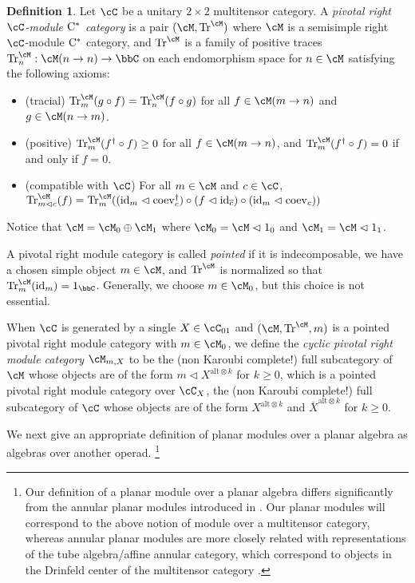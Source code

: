 \documentclass[11pt]{article}
\theoremstyle{plain}
\theoremstyle{definition}
\newtheorem{defn}[thm]{Definition}
\DeclareMathOperator{\coev}{coev}
\DeclareMathOperator{\id}{id}
\DeclareMathOperator{\Tr}{Tr}
\newcommand{\Cstar}{\rm{C^*}}
\begin{document}
\begin{defn}
 \label{def:PivotalModule}
Let $\cC$ be a unitary $2\times 2$ multitensor category.
A \emph{pivotal right $\cC$-module $\Cstar$ category} is a pair $(\cM,\Tr^\cM)$ where
$\cM$ is a semisimple right $\cC$-module $\Cstar$ category, and $\Tr^\cM$ is a family of positive traces $\Tr^\cM_n:\cM(n \to n)\to \bbC$ on each endomorphism space for $n\in \cM$ satisfying the following axioms:
\begin{itemize}
\item
(tracial)
$\Tr^\cM_m(g \circ f) = \Tr^\cM_n(f\circ g)$ for all $f\in \cM(m\to n)$ and $g\in \cM(n \to m)$.
\item
(positive)
$\Tr^\cM_m(f^\dag \circ f) \geq 0$ for all $f\in \cM(m \to n)$, and $\Tr^\cM_m(f^\dag \circ f) =0$ if and only if $f = 0$.
\item
(compatible with $\cC$)
For all $m\in \cM$ and $c\in \cC$,
$
\Tr^\cM_{m\vartriangleleft c}(f)
=
\Tr^\cM_{m}(
(\id_m \vartriangleleft \coev_c^\dag) \circ (f\vartriangleleft \id_{\overline{c}}) \circ (\id_m \vartriangleleft \coev_c)
)
$
\end{itemize}
Notice that $\cM = \cM_0 \oplus \cM_1$ where $\cM_0 = \cM \vartriangleleft 1_0$ and $\cM_1 = \cM\vartriangleleft 1_1$.

A pivotal right module category is called \emph{pointed} if it is indecomposable, we have a chosen simple object $m\in \cM$, and $\Tr^\cM$ is normalized so that $\Tr^\cM_m(\id_m) = 1_\bbC$.
Generally, we choose $m\in \cM_0$, but this choice is not essential.

When $\cC$ is generated by a single $X\in \cC_{01}$ and $(\cM,\Tr^\cM,m)$ is a pointed pivotal right module category with $m\in \cM_0$, we define the \emph{cyclic pivotal right module category} $\cM_{m,X}$ to be the (non Karoubi complete!) full subcategory of $\cM$ whose objects are of the form 
$
m \vartriangleleft X^{ \text{alt}\otimes k}
$ 
for $k\geq 0$, which is a pointed pivotal right module category over $\cC_X$, the (non Karoubi complete!) full subcategory of $\cC$ whose objects are of the form $X^{ \text{alt}\otimes k}$ and $\overline{X}^{ \text{alt}\otimes k}$ for $k\geq 0$.
\end{defn}


We next give an appropriate definition of planar modules over a planar algebra as algebras over another operad.
\footnote{
Our definition of a planar module over a planar algebra differs significantly from the annular planar modules introduced in \cite{MR1929335}. 
Our planar modules will correspond to the above notion of module over a multitensor category, 
whereas annular planar modules 
are more closely related with representations of the tube algebra/affine annular category, which correspond to objects in the Drinfeld center of the multitensor category \cite{MR3447719}.
}
\end{document}
